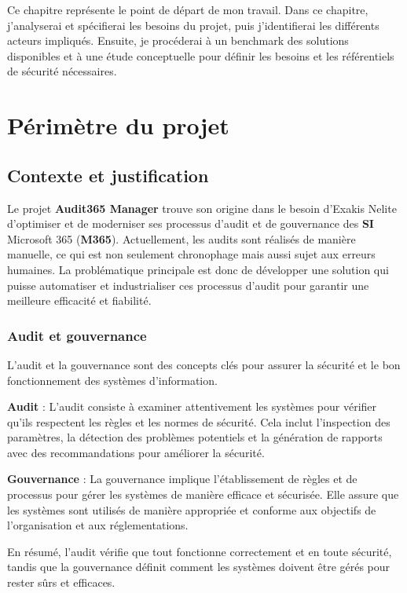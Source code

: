 
Ce chapitre représente le point de départ de mon travail. Dans ce chapitre, j'analyserai et spécifierai les besoins du projet, puis j'identifierai les différents acteurs impliqués. Ensuite, je procéderai à un benchmark des solutions disponibles et à une étude conceptuelle pour définir les besoins et les référentiels de sécurité nécessaires.

\section{Périmètre du projet}
\subsection{Contexte et justification}
Le projet \textbf{Audit365 Manager} trouve son origine dans le besoin d'Exakis Nelite d'optimiser et de moderniser ses processus d'audit et de gouvernance des \textbf{SI} Microsoft 365 (\textbf{M365}). Actuellement, les audits sont réalisés de manière manuelle, ce qui est non seulement chronophage mais aussi sujet aux erreurs humaines. La problématique principale est donc de développer une solution qui puisse automatiser et industrialiser ces processus d'audit pour garantir une meilleure efficacité et fiabilité.

\subsubsection{Audit et gouvernance}

L'audit et la gouvernance sont des concepts clés pour assurer la sécurité et le bon fonctionnement des systèmes d'information.

\textbf{Audit} : L'audit consiste à examiner attentivement les systèmes pour vérifier qu'ils respectent les règles et les normes de sécurité. Cela inclut l'inspection des paramètres, la détection des problèmes potentiels et la génération de rapports avec des recommandations pour améliorer la sécurité.

\textbf{Gouvernance} : La gouvernance implique l'établissement de règles et de processus pour gérer les systèmes de manière efficace et sécurisée. Elle assure que les systèmes sont utilisés de manière appropriée et conforme aux objectifs de l'organisation et aux réglementations.

En résumé, l'audit vérifie que tout fonctionne correctement et en toute sécurité, tandis que la gouvernance définit comment les systèmes doivent être gérés pour rester sûrs et efficaces.


